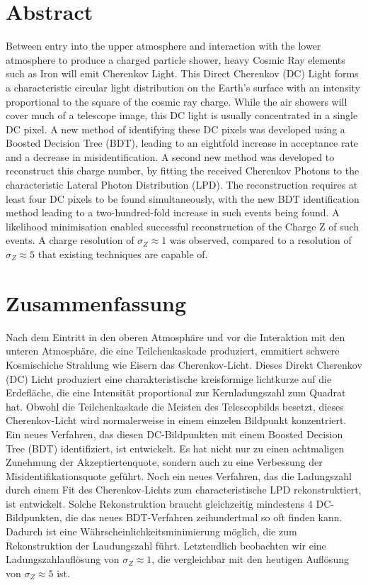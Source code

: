 \documentclass[11pt]{article}
\begin{document}
\section*{Abstract}
Between entry into the upper atmosphere and interaction with the lower atmosphere to produce a charged particle shower, heavy Cosmic Ray elements such as Iron will emit Cherenkov Light. This Direct Cherenkov (DC) Light forms a characteristic circular light distribution on the Earth's surface with an intensity proportional to the square of the cosmic ray charge. While the air showers will cover much of a telescope image, this DC light is usually concentrated in a single DC pixel. A new method of identifying these DC pixels was developed using a Boosted Decision Tree (BDT), leading to an eightfold increase in acceptance rate and a decrease in misidentification. A second new method was developed to reconstruct this charge number, by fitting the received Cherenkov Photons to the characteristic Lateral Photon Distribution (LPD). The reconstruction requires at least four DC pixels to be found simultaneously, with the new BDT identification method leading to a two-hundred-fold increase in such events being found. A likelihood minimisation enabled successful reconstruction of the Charge Z of such events. A charge resolution of $\sigma_{Z} \approx 1$ was observed, compared to a resolution of  $\sigma_{Z} \approx 5$ that existing techniques are capable of.

\section*{Zusammenfassung}
Nach dem Eintritt in den oberen Atmosph\"{a}re und vor die Interaktion mit den unteren Atmosph\"{a}re, die eine Teilchenkaskade produziert, emmitiert schwere Kosmischiche Strahlung wie Eisern das Cherenkov-Licht. Dieses Direkt Cherenkov (DC) Licht produziert eine charakteristische kreisformige lichtkurze auf die Erdefl\"{a}che, die eine Intensit\"{a}t proportional zur Kernladungszahl zum Quadrat hat. Obwohl die Teilchenkaskade die Meisten des Telescopbilds besetzt, dieses Cherenkov-Licht wird normalerweise in einem einzelen Bildpunkt konzentriert. Ein neues Verfahren, das diesen DC-Bildpunkten mit einem Boosted Decision Tree (BDT) identifiziert, ist entwickelt. Es hat nicht nur zu einen achtmaligen Zunehmung der Akzeptiertenquote, sondern auch zu eine Verbessung der Misidentifikationsquote gef\"{u}hrt. Noch ein neues Verfahren, das die Ladungszahl durch einem Fit des Cherenkov-Lichts zum characteristische LPD rekonstruktiert, ist entwickelt. Solche Rekonstruktion braucht gleichzeitig mindestens 4 DC-Bildpunkten, die das neues BDT-Verfahren zeihundertmal so oft finden kann. Dadurch ist eine W\"{a}hrscheinlichkeitsminimierung
m\"{o}glich, die zum Rekonstruktion der Laudungszahl f\"{u}hrt. Letztendlich beobachten wir eine Ladungszahlaufl\"{o}sung von $\sigma_{Z} \approx 1$, die vergleichbar mit den heutigen Aufl\"{o}sung von $\sigma_{Z} \approx 5$ ist.
\newpage
\tableofcontents
\newpage
\end{document}
